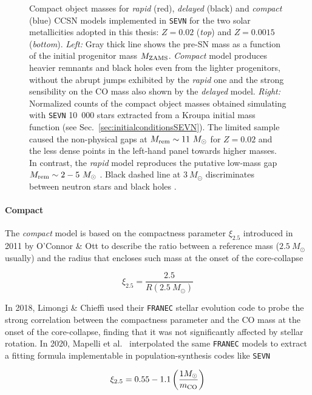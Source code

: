 \documentclass[a4paper,titlepage]{book}     	%
\newcommand{\sun}{\ensuremath{_\odot}}
\newcommand{\mzams}{M_\textup{ZAMS}}
\newcommand{\msun}{\ensuremath{M\sun}}
\begin{document}
\begin{figure}[t!]
	\caption{Compact object masses for \emph{rapid} (red), \emph{delayed} (black) and \emph{compact} (blue) CCSN models implemented in \texttt{SEVN} for the two solar metallicities adopted in this thesis: $Z=0.02$ (\emph{top}) and $Z=0.0015$ (\emph{bottom}). \emph{Left:} Gray thick line shows the pre-SN mass as a function of the initial progenitor mass $\mzams$. \emph{Compact} model produces heavier remnants and black holes even from the lighter progenitors, without the abrupt jumps exhibited by the \emph{rapid} one and the strong sensibility on the CO mass also shown by the \emph{delayed} model. \emph{Right:} Normalized counts of the compact object masses obtained simulating with \texttt{SEVN} 10~000 stars extracted from a Kroupa initial mass function (see Sec.\ \ref{sec:initialconditionsSEVN}). The limited sample caused the non-physical gaps at $M_{\rm rem} \sim 11~\msun$ for $Z=0.02$ and the less dense points in the left-hand panel towards higher masses. In contrast, the \emph{rapid} model reproduces the putative low-mass gap $M_{\rm rem} \sim 2-5~\msun$ \cite{massgapreal_ozel2010}. Black dashed line at $3~\msun$ discriminates between neutron stars and black holes \cite{NSreview}. }\label{fig:remnants}
\end{figure}


\paragraph{Compact} The \emph{compact} model is based on the compactness parameter $\xi_\mathrm{2.5}$ introduced in 2011 by O'Connor \& Ott \cite{Oconnor2011_compactness} to describe the ratio between a reference mass ($2.5~\msun$ usually) and the radius that encloses such mass at the onset of the core-collapse

\begin{equation}\label{eq:compactness}
\xi_\mathrm{2.5}= \frac{2.5}{R(2.5 ~\msun)}
\end{equation}

In 2018, Limongi \& Chieffi \cite{Limongi2018_rotatingCOcompactness} used their \texttt{FRANEC} stellar evolution code to probe the strong correlation between the compactness parameter and the CO mass at the onset of the core-collapse, finding that it was not significantly affected by stellar rotation. In 2020, Mapelli et al.\ \cite{mapelli2020_compactness} interpolated the same \texttt{FRANEC} models to extract a fitting formula implementable in population-synthesis codes like \texttt{SEVN}

\begin{equation}\label{eq:compactnessCOinSEVN}
	\xi_{2.5} = 0.55 -1.1 \left(\frac{1 \msun}{m_{\rm CO}}\right)
\end{equation}
\end{document}
